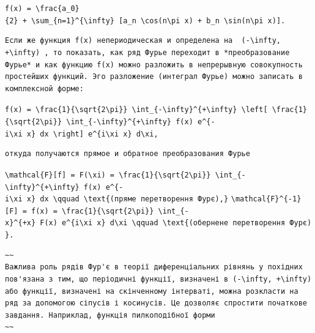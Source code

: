 \documentclass[
  ukrainian,
]{article}
\begin{document}
\texttt{f(x)\ =\ \textbackslash{}frac\{a\_0\}\{2\}\ +\ \textbackslash{}sum\_\{n=1\}\^{}\{\textbackslash{}infty\}\ {[}a\_n\ \textbackslash{}cos(n\textbackslash{}pi\ x)\ +\ b\_n\ \textbackslash{}sin(n\textbackslash{}pi\ x){]}.}

\begin{verbatim}
Если же функция f(x) непериодическая и определена на  (-\infty, +\infty) , то показать, как ряд Фурье переходит в *преобразование Фурье* и как функцию f(x) можно разложить в непрерывную совокупность простейших функций. Эго разложение (интеграл Фурье) можно записать в комплексной форме:
\end{verbatim}

\texttt{f(x)\ =\ \textbackslash{}frac\{1\}\{\textbackslash{}sqrt\{2\textbackslash{}pi\}\}\ \textbackslash{}int\_\{-\textbackslash{}infty\}\^{}\{+\textbackslash{}infty\}\ \textbackslash{}left{[}\ \textbackslash{}frac\{1\}\{\textbackslash{}sqrt\{2\textbackslash{}pi\}\}\ \textbackslash{}int\_\{-\textbackslash{}infty\}\^{}\{+\textbackslash{}infty\}\ f(x)\ e\^{}\{-i\textbackslash{}xi\ x\}\ dx\ \textbackslash{}right{]}\ e\^{}\{i\textbackslash{}xi\ x\}\ d\textbackslash{}xi,}

\begin{verbatim}
откуда получаются прямое и обратное преобразования Фурье
\end{verbatim}

\texttt{\textbackslash{}mathcal\{F\}{[}f{]}\ =\ F(\textbackslash{}xi)\ =\ \textbackslash{}frac\{1\}\{\textbackslash{}sqrt\{2\textbackslash{}pi\}\}\ \textbackslash{}int\_\{-\textbackslash{}infty\}\^{}\{+\textbackslash{}infty\}\ f(x)\ e\^{}\{-i\textbackslash{}xi\ x\}\ dx\ \textbackslash{}qquad\ \textbackslash{}text\{(пряме\ перетворення\ Фур\textquotesingle{}є),\}}
\texttt{\textbackslash{}mathcal\{F\}\^{}\{-1\}{[}F{]}\ =\ f(x)\ =\ \textbackslash{}frac\{1\}\{\textbackslash{}sqrt\{2\textbackslash{}pi\}\}\ \textbackslash{}int\_\{-x\}\^{}\{+x\}\ F(x)\ e\^{}\{i\textbackslash{}xi\ x\}\ d\textbackslash{}xi\ \textbackslash{}qquad\ \textbackslash{}text\{(обернене\ перетворення\ Фур\textquotesingle{}є)\}.}

\begin{verbatim}
~~
Важлива роль рядів Фур'є в теорії диференціальних рівнянь у похідних пов'язана з тим, що періодичні функції, визначені в (-\infty, +\infty) або функції, визначені на скінченному інтерваті, можна розкласти на ряд за допомогою сіпусів і косинусів. Це дозволяє спростити початкове завдання. Наприклад, функція пилкоподібної форми
~~
\end{verbatim}
\end{document}
